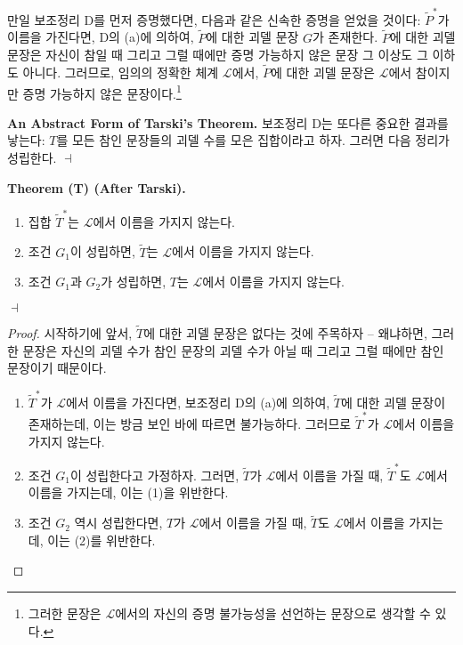 \documentclass[12pt]{paper}
\newenvironment{context}[1][]{\noindent \textbf{{#1}.}}{\hfill $ \dashv $}
\begin{document}
  만일 보조정리 D를 먼저 증명했다면, 다음과 같은 신속한 증명을 얻었을 것이다:
  $\tilde{P}^{*}$가 이름을 가진다면, D의 (a)에 의하여, $\tilde{P}$에 대한 괴델 문장 $G$가 존재한다.
  $\tilde{P}$에 대한 괴델 문장은 자신이 참일 때 그리고 그럴 때에만 증명 가능하지 않은 문장 그 이상도 그 이하도 아니다.
  그러므로, 임의의 정확한 체계 $\mathcal{L}$에서, $\tilde{P}$에 대한 괴델 문장은 $\mathcal{L}$에서 참이지만 증명 가능하지 않은 문장이다.\footnote
  {
    그러한 문장은 $\mathcal{L}$에서의 자신의 증명 불가능성을 선언하는 문장으로 생각할 수 있다.
  }

  \begin{context}[An Abstract Form of Tarski's Theorem]
    보조정리 D는 또다른 중요한 결과를 낳는다:
    $T$를 모든 참인 문장들의 괴델 수를 모은 집합이라고 하자.
    그러면 다음 정리가 성립한다.
  \end{context}

  \begin{context}[Theorem (T) (After Tarski)]
    \begin{enumerate}
      \item 집합 $\tilde{T}^{*}$는 $\mathcal{L}$에서 이름을 가지지 않는다.
      \item 조건 $G_1$이 성립하면, $\tilde{T}$는 $\mathcal{L}$에서 이름을 가지지 않는다.
      \item 조건 $G_1$과 $G_2$가 성립하면, $T$는 $\mathcal{L}$에서 이름을 가지지 않는다.
    \end{enumerate}
  \end{context}

  \begin{proof}
    시작하기에 앞서, $\tilde{T}$에 대한 괴델 문장은 없다는 것에 주목하자 --
    왜냐하면, 그러한 문장은 자신의 괴델 수가 참인 문장의 괴델 수가 아닐 때 그리고 그럴 때에만 참인 문장이기 때문이다.
    \begin{enumerate}
      \item $\tilde{T}^{*}$가 $\mathcal{L}$에서 이름을 가진다면, 보조정리 D의 (a)에 의하여,
      $\tilde{T}$에 대한 괴델 문장이 존재하는데, 이는 방금 보인 바에 따르면 불가능하다.
      그러므로 $\tilde{T}^{*}$가 $\mathcal{L}$에서 이름을 가지지 않는다.
      
      \item 조건 $G_1$이 성립한다고 가정하자.
      그러면, $\tilde{T}$가 $\mathcal{L}$에서 이름을 가질 때,
      $\tilde{T}^{*}$도 $\mathcal{L}$에서 이름을 가지는데,
      이는 (1)을 위반한다.
      
      \item 조건 $G_2$ 역시 성립한다면,
      $T$가 $\mathcal{L}$에서 이름을 가질 때,
      $\tilde{T}$도 $\mathcal{L}$에서 이름을 가지는데,
      이는 (2)를 위반한다.
    \end{enumerate}
  \end{proof}
\end{document}
